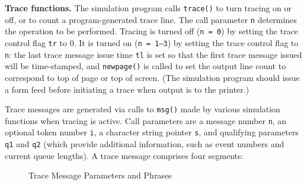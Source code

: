 \textbf{Trace functions.} The simulation program calls \texttt{trace()} to turn tracing on
or off, or to count a program-generated trace line. The call parameter \texttt{n}
determines the operation to be performed. Tracing is turned off (\texttt{n = 0}) by
setting the trace control flag \texttt{tr} to 0. It is turned on (\texttt{n = 1--3}) by setting the
trace control flag to \texttt{n}: the last trace message issue time \texttt{tl} is set so that the
first trace message issued will be time-stamped, and \texttt{newpage()} is called to
set the output line count to correspond to top of page or top of screen. (The
simulation program should issue a form feed before initiating a trace when
output is to the printer.)

Trace messages are generated via calls to \texttt{msg()} made by various
simulation functions when tracing is active. Call parameters are a message
number \texttt{n}, an optional token number \texttt{i}, a character string pointer \texttt{s}, and
qualifying parameters \texttt{q1} and \texttt{q2} (which provide additional information,
such as event numbers and current queue lengths). A trace message comprises
four segments:

\begin{figure}[H]
\centering\footnotesize\ttfamily
{}
\caption{Trace Message Parameters and Phrases}
\end{figure}

